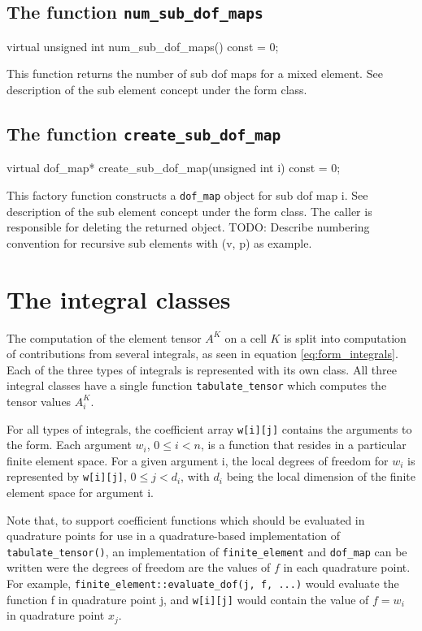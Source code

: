 \subsection{The function \texttt{num\_sub\_dof\_maps}}

\begin{code}
virtual unsigned int num_sub_dof_maps() const = 0;
\end{code}

This function returns the number of sub dof maps for a mixed element.
See description of the sub element concept under the form class.

\subsection{The function \texttt{create\_sub\_dof\_map}}

\begin{code}
virtual dof_map* create_sub_dof_map(unsigned int i) const = 0;
\end{code}

This factory function constructs a \texttt{dof\_map} object for sub dof map i.
See description of the sub element concept under the form class.
The caller is responsible for deleting the returned object.
TODO: Describe numbering convention for recursive sub elements with (v, p) as example.

\section{The integral classes}

The computation of the element tensor $A^K$ on a cell $K$ is split into computation of
contributions from several integrals, as seen in equation \eqref{eq:form_integrals}.
Each of the three types of integrals is represented with its own class.
All three integral classes have a single function \texttt{tabulate\_tensor} which
computes the tensor values $A_i^K$.

For all types of integrals, the coefficient array \texttt{w[i][j]} contains the
arguments to the form. Each argument $w_i$, $0\le i<n$, is a function that resides in a 
particular finite element space. For a given argument i, the local degrees of freedom for $w_i$
is represented by \texttt{w[i][j]}, $0 \le j < d_i$, with $d_i$ being the local dimension of
the finite element space for argument i.

Note that, to support coefficient functions which should be evaluated in quadrature points
for use in a quadrature-based implementation of \texttt{tabulate\_tensor()},
an implementation of \texttt{finite\_element} and \texttt{dof\_map}
can be written were the degrees of freedom are the values of $f$ in each
quadrature point. For example, \texttt{finite\_element::evaluate\_dof(j, f, ...)}
would evaluate the function f in quadrature point j, and \texttt{w[i][j]} would contain
the value of $f=w_i$ in quadrature point $x_j$.

